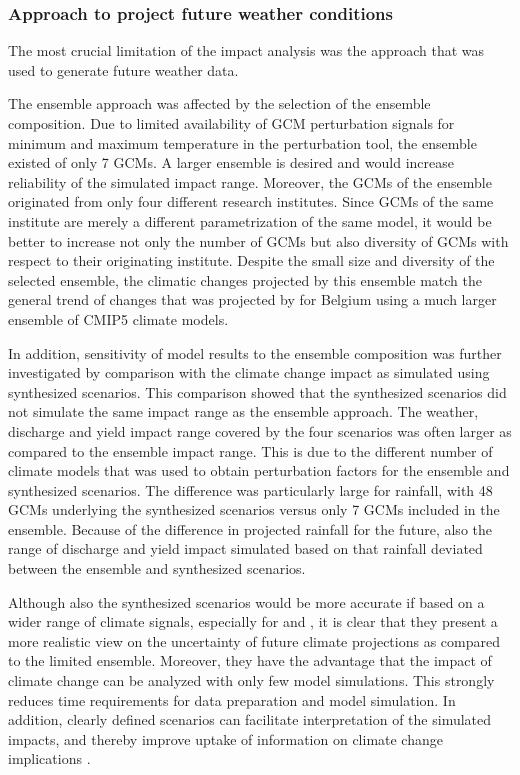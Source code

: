 \subsubsection{Approach to project future weather conditions}
The most crucial limitation of the impact analysis was the approach that was used to generate future weather data. 

The ensemble approach was affected by the selection of the ensemble composition. Due to limited availability of GCM perturbation signals for minimum and maximum temperature in the perturbation tool, the ensemble existed of only 7 GCMs. A larger ensemble is desired and would increase reliability of the simulated impact range. Moreover, the GCMs of the ensemble originated from only four different research institutes. Since GCMs of the same institute are merely a different parametrization of the same model, it would be better to increase not only the number of GCMs but also diversity of GCMs with respect to their originating institute. Despite the small size and diversity of the selected ensemble, the climatic changes projected by this ensemble match the general trend of changes that was projected by \textcite{tabari2015,tabari2015a} for Belgium using a much larger ensemble of  CMIP5 climate models. 

In addition, sensitivity of model results to the ensemble composition was further investigated by comparison with the climate change impact as simulated using synthesized scenarios. This comparison showed that the synthesized scenarios did not simulate the same impact range as the ensemble approach. The weather, discharge and yield impact range covered by the four scenarios was often larger as compared to the ensemble impact range. This is due to the different number of climate models that was used to obtain perturbation factors for the ensemble and synthesized scenarios. The difference was particularly large for rainfall, with 48 GCMs underlying the synthesized scenarios versus only 7 GCMs included in the ensemble.  Because of the difference in projected rainfall for the future, also the range of discharge and yield impact simulated based on that rainfall deviated between the ensemble and synthesized scenarios.

Although also the synthesized scenarios would be more accurate if based on a wider range of climate signals, especially for \Tmin and \Tmax, it is clear that they present a more realistic view on the uncertainty of future climate projections as compared to the limited ensemble. Moreover, they have the advantage that the impact of climate change can be analyzed with only few model simulations. This strongly reduces time requirements for data preparation and model simulation. In addition, clearly defined scenarios can facilitate interpretation of the simulated impacts, and thereby improve uptake of information on climate change implications \parencite{wilby2009}.

